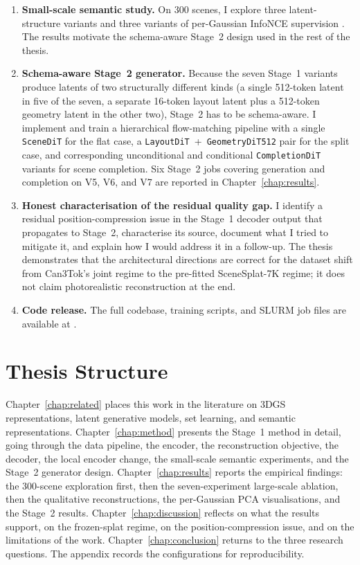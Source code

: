 \begin{enumerate}
\item \textbf{Small-scale semantic study.} On $300$ scenes, I explore three latent-structure variants and three variants of per-Gaussian InfoNCE supervision \citep{oord2018cpc}. The results motivate the schema-aware Stage~2 design used in the rest of the thesis.

\item \textbf{Schema-aware Stage~2 generator.} Because the seven Stage~1 variants produce latents of two structurally different kinds (a single 512-token latent in five of the seven, a separate 16-token layout latent plus a 512-token geometry latent in the other two), Stage~2 has to be schema-aware. I implement and train a hierarchical flow-matching pipeline \citep{lipman2023flowmatching, peebles2023dit, ma2024sit} with a single \texttt{SceneDiT} for the flat case, a \texttt{LayoutDiT}~+~\texttt{GeometryDiT512} pair for the split case, and corresponding unconditional and conditional \texttt{CompletionDiT} variants for scene completion. Six Stage~2 jobs covering generation and completion on V5, V6, and V7 are reported in Chapter~\ref{chap:results}.

\item \textbf{Honest characterisation of the residual quality gap.} I identify a residual position-compression issue in the Stage~1 decoder output that propagates to Stage~2, characterise its source, document what I tried to mitigate it, and explain how I would address it in a follow-up. The thesis demonstrates that the architectural directions are correct for the dataset shift from Can3Tok's joint regime to the pre-fitted SceneSplat-7K regime; it does not claim photorealistic reconstruction at the end.

\item \textbf{Code release.} The full codebase, training scripts, and SLURM job files are available at \repo.
\end{enumerate}

\section{Thesis Structure}
\label{sec:intro_structure}

Chapter~\ref{chap:related} places this work in the literature on 3DGS representations, latent generative models, set learning, and semantic representations. Chapter~\ref{chap:method} presents the Stage~1 method in detail, going through the data pipeline, the encoder, the reconstruction objective, the decoder, the local encoder change, the small-scale semantic experiments, and the Stage~2 generator design. Chapter~\ref{chap:results} reports the empirical findings: the 300-scene exploration first, then the seven-experiment large-scale ablation, then the qualitative reconstructions, the per-Gaussian PCA visualisations, and the Stage~2 results. Chapter~\ref{chap:discussion} reflects on what the results support, on the frozen-splat regime, on the position-compression issue, and on the limitations of the work. Chapter~\ref{chap:conclusion} returns to the three research questions. The appendix records the configurations for reproducibility.